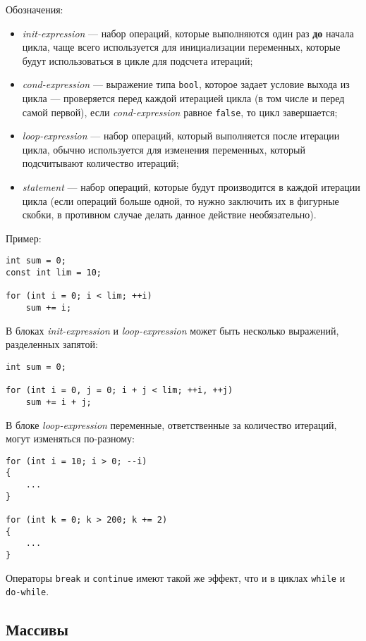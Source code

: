 Обозначения:
\begin{itemize}
    \item \textit{init-expression} --- набор операций, которые выполняются один раз \textbf{до} начала цикла, чаще всего используется для инициализации переменных, которые будут использоваться в цикле для подсчета итераций;
    \item \textit{cond-expression} --- выражение типа \lstinline|bool|, которое задает условие выхода из цикла --- проверяется перед каждой итерацией цикла (в том числе и перед самой первой), если \textit{cond-expression} равное \lstinline|false|, то цикл завершается;
    \item \textit{loop-expression} --- набор операций, который выполняется после итерации цикла, обычно используется для изменения переменных, который подсчитывают количество итераций;
    \item \textit{statement} --- набор операций, которые будут производится в каждой итерации цикла (если операций больше одной, то нужно заключить их в фигурные скобки, в противном случае делать данное действие необязательно).
\end{itemize}

Пример:

\begin{lstlisting}
int sum = 0;
const int lim = 10;

for (int i = 0; i < lim; ++i)
    sum += i;
\end{lstlisting}

В блоках \textit{init-expression} и \textit{loop-expression} может быть несколько выражений, разделенных запятой:
\begin{lstlisting}
int sum = 0;

for (int i = 0, j = 0; i + j < lim; ++i, ++j)
    sum += i + j;
\end{lstlisting}

В блоке \textit{loop-expression} переменные, ответственные за количество
итераций, могут изменяться по-разному:
\begin{lstlisting}
for (int i = 10; i > 0; --i)
{
    ...
}

for (int k = 0; k > 200; k += 2)
{
    ...
}
\end{lstlisting}

Операторы \lstinline|break| и \lstinline|continue| имеют такой же эффект, что и в циклах \lstinline|while| и \lstinline|do-while|.

\subsection{Массивы}
\label{subsec:Arrays}
